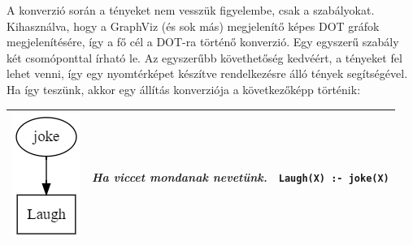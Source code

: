 A konverzió során a tényeket nem vesszük figyelembe, csak a szabályokat. Kihasználva, hogy a GraphViz (és sok más) megjelenítő képes DOT gráfok megjelenítésére, így a fő cél a DOT-ra történő konverzió. Egy egyszerű szabály két csomóponttal írható le. Az egyszerűbb követhetőség kedvéért, a tényeket fel lehet venni, így egy nyomtérképet készítve rendelkezésre álló tények segítségével. Ha így teszünk, akkor egy állítás konverziója  a következőképp történik:
\begin{table}[h!]
\centering
\begin{tabular}{|c|c|c|}
\hline
\includegraphics[scale=1]{images/joke1.png} & \textit{Ha viccet mondanak nevetünk.} &\texttt{Laugh(X) :- joke(X)} \\
\hline
\end{tabular}
\end{table}

